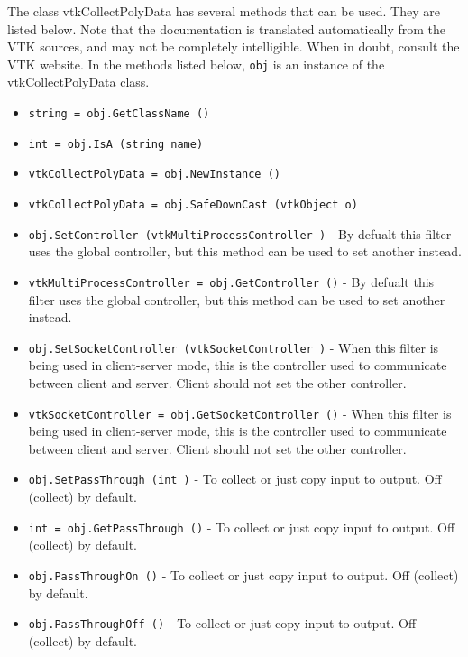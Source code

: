 The class vtkCollectPolyData has several methods that can be used.
  They are listed below.
Note that the documentation is translated automatically from the VTK sources,
and may not be completely intelligible.  When in doubt, consult the VTK website.
In the methods listed below, \verb|obj| is an instance of the vtkCollectPolyData class.
\begin{itemize}
\item  \verb|string = obj.GetClassName ()|

\item  \verb|int = obj.IsA (string name)|

\item  \verb|vtkCollectPolyData = obj.NewInstance ()|

\item  \verb|vtkCollectPolyData = obj.SafeDownCast (vtkObject o)|

\item  \verb|obj.SetController (vtkMultiProcessController )| -  By defualt this filter uses the global controller,
 but this method can be used to set another instead.

\item  \verb|vtkMultiProcessController = obj.GetController ()| -  By defualt this filter uses the global controller,
 but this method can be used to set another instead.

\item  \verb|obj.SetSocketController (vtkSocketController )| -  When this filter is being used in client-server mode,
 this is the controller used to communicate between
 client and server.  Client should not set the other controller.

\item  \verb|vtkSocketController = obj.GetSocketController ()| -  When this filter is being used in client-server mode,
 this is the controller used to communicate between
 client and server.  Client should not set the other controller.

\item  \verb|obj.SetPassThrough (int )| -  To collect or just copy input to output. Off (collect) by default.

\item  \verb|int = obj.GetPassThrough ()| -  To collect or just copy input to output. Off (collect) by default.

\item  \verb|obj.PassThroughOn ()| -  To collect or just copy input to output. Off (collect) by default.

\item  \verb|obj.PassThroughOff ()| -  To collect or just copy input to output. Off (collect) by default.

\end{itemize}
